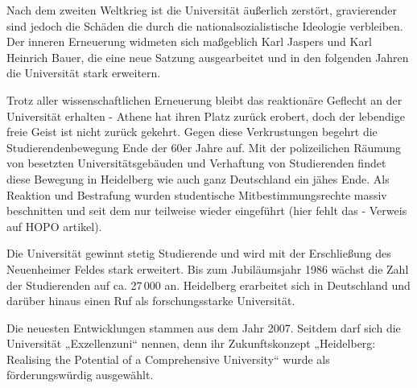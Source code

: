Nach dem zweiten Weltkrieg ist die Universität äußerlich zerstört, gravierender sind jedoch die Schäden die durch die nationalsozialistische Ideologie verbleiben. Der inneren Erneuerung widmeten sich maßgeblich Karl Jaspers und Karl Heinrich Bauer, die eine neue Satzung ausgearbeitet und in den folgenden Jahren die Universität stark erweitern. 

Trotz aller wissenschaftlichen Erneuerung bleibt das reaktionäre Geflecht an der Universität erhalten - Athene hat ihren Platz zurück erobert, doch der lebendige freie Geist ist nicht zurück gekehrt. Gegen diese Verkrustungen begehrt die Studierendenbewegung Ende der 60er Jahre auf. Mit der polizeilichen Räumung von besetzten Universitätsgebäuden und Verhaftung von Studierenden findet diese Bewegung in Heidelberg wie auch ganz Deutschland ein jähes Ende. Als Reaktion und Bestrafung wurden studentische Mitbestimmungsrechte massiv beschnitten und seit dem nur teilweise wieder eingeführt (hier fehlt das - Verweis auf HOPO artikel).

Die Universität gewinnt stetig Studierende und wird mit der Erschließung des Neuenheimer Feldes stark erweitert. Bis zum Jubiläumsjahr 1986 wächst die Zahl der Studierenden auf ca. 27\,000 an. Heidelberg erarbeitet sich in Deutschland und darüber hinaus einen Ruf als forschungsstarke Universität.

Die neuesten Entwicklungen stammen aus dem Jahr 2007. Seitdem darf sich die Universität „Exzellenzuni“ nennen, denn ihr Zukunftskonzept „Heidelberg: Realising the Potential of a Comprehensive University“ wurde als förderungswürdig ausgewählt. 
